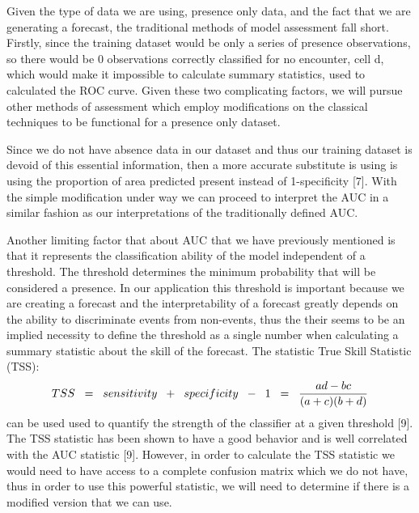 \noindent Given the type of data we are using, presence only data, and the fact that we are generating a forecast, the traditional methods of model assessment fall short. Firstly, since the training dataset would be only a series of presence observations, so there would be 0 observations correctly classified for no encounter, cell d,  which would make it impossible to calculate summary statistics, used to calculated the ROC curve. Given these two complicating factors, we will pursue other methods of assessment which employ modifications on the classical techniques to be functional for a presence only dataset.  \newline

\noindent Since we do not have absence data in our dataset and thus our training dataset is devoid of this essential information, then a more accurate substitute is using is using the proportion of area predicted present instead of 1-specificity [7]. With the simple modification under way we can proceed to interpret the AUC in a similar fashion as our interpretations of the traditionally defined AUC.  \newline

\noindent Another limiting factor that about AUC that we have previously mentioned is that it represents the classification ability of the model independent of a threshold. The threshold determines the minimum probability that will be considered a presence. In our application this threshold is important because we are creating a forecast and the interpretability of a forecast greatly depends on the ability to discriminate events from non-events, thus the their seems to be an implied necessity to define the threshold as a single number when calculating a summary statistic about the skill of the forecast. The statistic True Skill Statistic (TSS):
\begin{equation}
TSS \hspace{0.2cm} = \hspace{0.2cm} sensitivity \hspace{0.2cm} + \hspace{0.2cm} specificity\hspace{0.2cm}  -\hspace{0.2cm} 1 \hspace{0.2cm} =  \hspace{0.2cm} \frac{ad -bc}{(a+c)(b+d)}
\end{equation}
can be used used to quantify the strength of the classifier at a given threshold [9]. The TSS statistic has been shown to have a good behavior and is well correlated with the AUC statistic [9]. However, in order to calculate the TSS statistic we would need to have access to a complete confusion matrix which we do not have, thus in order to use this powerful statistic, we will need to determine if there is a modified version that we can use. \newline


